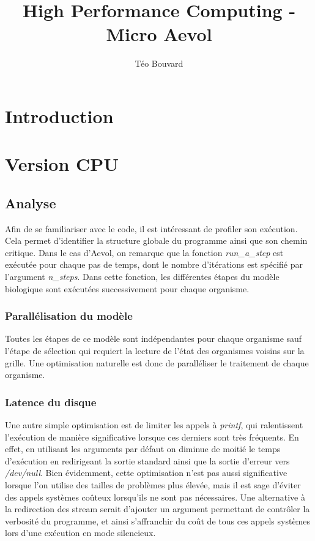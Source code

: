 \documentclass[a4paper, 10pt, twoside]{article}
\begin{document}
\title{High Performance Computing - Micro Aevol}
\author{T\'eo Bouvard}
\maketitle

\section{Introduction}

\section{Version CPU}

\subsection{Analyse}
Afin de se familiariser avec le code, il est intéressant de profiler son exécution. Cela permet d'identifier la structure globale du programme ainsi que son chemin critique. Dans le cas d'Aevol, on remarque que la fonction \textit{run\_a\_step} est exécutée pour chaque pas de temps, dont le nombre d'itérations est spécifié par l'argument \textit{n\_steps}.
Dans cette fonction, les différentes étapes du modèle biologique sont exécutées successivement pour chaque organisme.
\subsubsection*{Parallélisation du modèle}

Toutes les étapes de ce modèle sont indépendantes pour chaque organisme sauf l'étape de sélection qui requiert la lecture de l'état des organismes voisins sur la grille. Une optimisation naturelle est donc de paralléliser le traitement de chaque organisme\label{parallel/orga}.

\subsubsection*{Latence du disque}

Une autre simple optimisation est de limiter les appels à \textit{printf}, qui ralentissent l'exécution de manière significative lorsque ces derniers sont très fréquents. En effet, en utilisant les arguments par défaut on diminue de moitié le temps d'exécution en redirigeant la sortie standard ainsi que la sortie d'erreur vers \textit{/dev/null}. Bien évidemment, cette optimisation n'est pas aussi significative lorsque l'on utilise des tailles de problèmes plus élevée, mais il est sage d'éviter des appels systèmes coûteux lorsqu'ils ne sont pas nécessaires. Une alternative à la redirection des stream serait d'ajouter un argument permettant de contrôler la verbosité du programme, et ainsi s'affranchir du coût de tous ces appels systèmes lors d'une exécution en mode silencieux.
\end{document}
